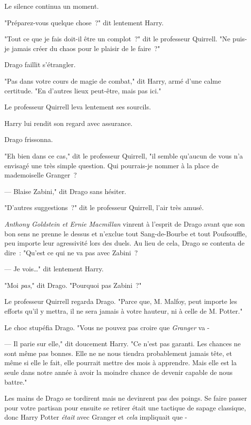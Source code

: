 Le silence continua un moment.

"Préparez-vous quelque chose~?" dit lentement Harry.

"Tout ce que je fais doit-il être un complot~?" dit le professeur Quirrell. "Ne puis-je jamais créer du chaos pour le plaisir de le faire~?"

Drago faillit s'étrangler.

"Pas dans votre cours de magie de combat," dit Harry, armé d'une calme certitude. "En d'autres lieux peut-être, mais pas ici."

Le professeur Quirrell leva lentement ses sourcils.

Harry lui rendit son regard avec assurance.

Drago frissonna.

"Eh bien dans ce cas," dit le professeur Quirrell, "il semble qu'aucun de vous n'a envisagé une très simple question. Qui pourrais-je nommer à la place de mademoiselle Granger~?

--- Blaise Zabini," dit Drago sans hésiter.

"D'autres suggestions~?" dit le professeur Quirrell, l'air très amusé.

\emph{Anthony Goldstein et Ernie Macmillan} vinrent à l'esprit de Drago avant que son bon sens ne prenne le dessus et n'exclue tout Sang-de-Bourbe et tout Poufsouffle, peu importe leur agressivité lors des duels. Au lieu de cela, Drago se contenta de dire~: "Qu'est ce qui ne va pas avec Zabini~?

--- Je vois…" dit lentement Harry.

"Moi \emph{pas}," dit Drago. "Pourquoi pas Zabini~?"

Le professeur Quirrell regarda Drago. "Parce que, M. Malfoy, peut importe les efforts qu'il y mettra, il ne sera jamais à votre hauteur, ni à celle de M. Potter."

Le choc stupéfia Drago. "Vous ne pouvez pas croire que \emph{Granger} va -

--- Il parie sur elle," dit doucement Harry. "Ce n'est pas garanti. Les chances ne sont même pas bonnes. Elle ne ne nous tiendra probablement jamais tête, et même si elle le fait, elle pourrait mettre des mois à apprendre. Mais elle est la seule dans notre année à avoir la moindre chance de devenir capable de nous battre."

Les mains de Drago se tordirent mais ne devinrent pas des poings. Se faire passer pour votre partisan pour ensuite se retirer était une tactique de sapage classique, donc Harry Potter \emph{était} avec Granger et \emph{cela} impliquait que -

